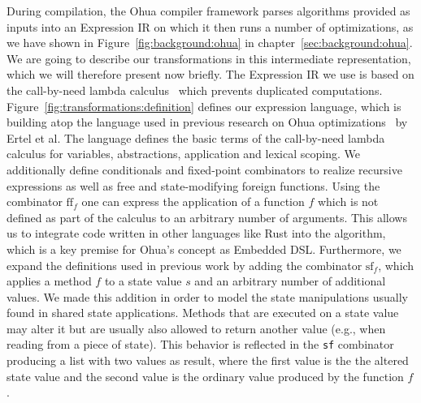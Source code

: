 During compilation, the Ohua compiler framework parses algorithms provided as inputs into an Expression IR on which it then runs a number of optimizations, as we have shown in Figure~\ref{fig:background:ohua} in chapter~\ref{sec:background:ohua}.
We are going to describe our transformations in this intermediate representation, which we will therefore present now briefly.
The Expression IR we use is based on the call-by-need lambda calculus~\cite{ariola1997lambda, ariola1995lambda} which prevents duplicated computations.
Figure~\ref{fig:transformations:definition} defines our expression language, which is building atop the language used in previous research on Ohua optimizations~\cite{ertel2018compiling} by Ertel et al.
The language defines the basic terms of the call-by-need lambda calculus for variables, abstractions, application and lexical scoping.
We additionally define conditionals and fixed-point combinators to realize recursive expressions as well as free and state-modifying foreign functions.
Using the combinator $\text{ff}_f$ one can express the application of a function $f$ which is not defined as part of the calculus to an arbitrary number of arguments.
This allows us to integrate code written in other languages like Rust into the algorithm, which is a key premise for Ohua's concept as Embedded DSL.
Furthermore, we expand the definitions used in previous work by adding the combinator $\text{sf}_f$, which applies a method $f$ to a state value $s$ and an arbitrary number of additional values.
We made this addition in order to model the state manipulations usually found in shared state applications.
Methods that are executed on a state value may alter it but are usually also allowed to return another value (e.g., when reading from a piece of state).
This behavior is reflected in the \texttt{sf} combinator producing a list with two values as result, where the first value is the the altered state value and the second value is the ordinary value produced by the function $f$.

